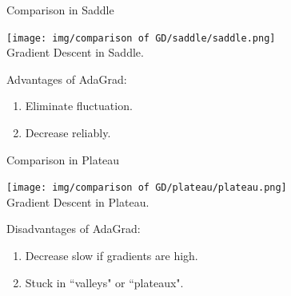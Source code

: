 \documentclass{beamer}
\begin{document}
\begin{frame}{Comparison in Saddle}

\begin{center}
	\texttt{[image: img/comparison of GD/saddle/saddle.png]}
    \\
    Gradient Descent in Saddle.
\end{center}
Advantages of AdaGrad:
\begin{enumerate}
    \item Eliminate fluctuation.
    \item Decrease reliably.

\end{enumerate}




\end{frame}



\begin{frame}{Comparison in Plateau}

\begin{center}
	\texttt{[image: img/comparison of GD/plateau/plateau.png]}
    \\
    Gradient Descent in Plateau.
\end{center}
Disadvantages of AdaGrad:
\begin{enumerate}
    \item Decrease slow if gradients are high.
    \item Stuck in ``valleys" or ``plateaux".
\end{enumerate}


\end{frame}
\end{document}
